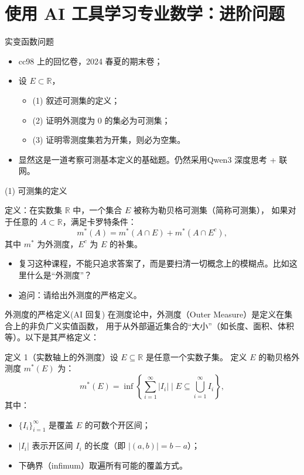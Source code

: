 \documentclass{beamer}
\begin{document}
\section{使用 AI 工具学习专业数学：进阶问题}

\begin{frame}{实变函数问题}
\begin{itemize}
  \item<1-> cc98 上的回忆卷，2024 春夏的期末卷；
  \item<2-> 设 $E \subset \mathbb{R}$，
  \begin{itemize}
    \item<2-> (1) 叙述可测集的定义；
    \item<2-> (2) 证明外测度为 $0$ 的集必为可测集；
    \item<2-> (3) 证明零测度集若为开集，则必为空集。
  \end{itemize} 
  \item<3-> 显然这是一道考察可测基本定义的基础题。仍然采用Qwen3 深度思考 + 联网。
\end{itemize}
\end{frame}

\begin{frame}{(1) 可测集的定义}

定义：在实数集 $\mathbb{R}$ 中，一个集合 $E$ 被称为勒贝格可测集（简称可测集），
如果对于任意的 $A \subset \mathbb{R}$，满足卡罗特条件：
$$
m^*(A) = m^*(A \cap E) + m^*(A \cap E^c),
$$
其中 $m^*$ 为外测度，$E^c$ 为 $E$ 的补集。
\begin{itemize}
  \item<2-> 复习这种课程，不能只追求答案了，而是要扫清一切概念上的模糊点。比如这里什么是“外测度”？
  \item<3-> 追问：请给出外测度的严格定义。 
\end{itemize}
\end{frame}

\begin{frame}{外测度的严格定义(AI 回复)}
\small
在测度论中，外测度（Outer Measure）是定义在集合上的非负广义实值函数，
用于从外部逼近集合的“大小”（如长度、面积、体积等）。以下是其严格定义：

定义 1（实数轴上的外测度）设 $E \subseteq \mathbb{R}$ 是任意一个实数子集。
定义 $E$ 的勒贝格外测度 $m^*(E)$ 为：
$$
m^*(E) = \inf \left\{ \sum_{i=1}^\infty |I_i| 
\mid E \subseteq \bigcup_{i=1}^\infty I_i \right\},
$$
其中：
\begin{itemize}
  \item $\{I_i\}_{i=1}^\infty$ 是覆盖 $E$ 的可数个开区间；
  \item $|I_i|$ 表示开区间 $I_i$ 的长度（即 $|(a, b)| = b - a$）；
  \item 下确界（infimum）取遍所有可能的覆盖方式。
\end{itemize}  
\end{frame}
\end{document}
